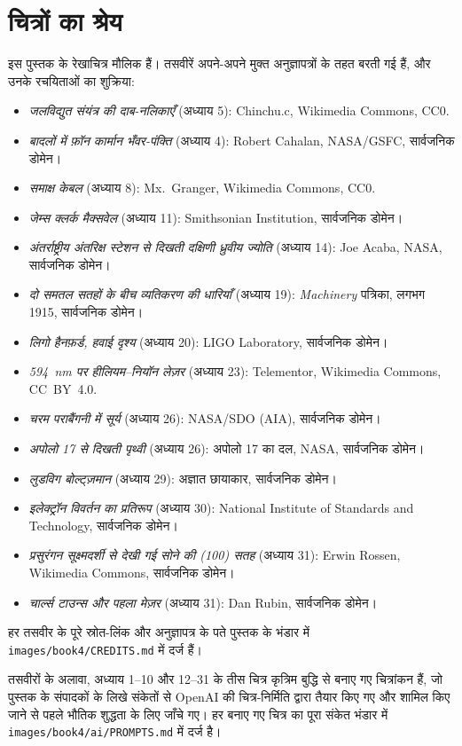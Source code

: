 \chapter*{चित्रों का श्रेय}

इस पुस्तक के रेखाचित्र मौलिक हैं। तसवीरें अपने-अपने मुक्त अनुज्ञापत्रों
के तहत बरती गई हैं, और उनके रचयिताओं का शुक्रिया:

\begin{itemize}
  \item \emph{जलविद्युत संयंत्र की दाब-नलिकाएँ} (अध्याय 5):
        Chinchu.c, Wikimedia Commons, CC0.
  \item \emph{बादलों में फ़ॉन कार्मान भँवर-पंक्ति} (अध्याय 4):
        Robert Cahalan, NASA/GSFC, सार्वजनिक डोमेन।
  \item \emph{समाक्ष केबल} (अध्याय 8): Mx.~Granger, Wikimedia
        Commons, CC0.
  \item \emph{जेम्स क्लर्क मैक्सवेल} (अध्याय 11): Smithsonian
        Institution, सार्वजनिक डोमेन।
  \item \emph{अंतर्राष्ट्रीय अंतरिक्ष स्टेशन से दिखती दक्षिणी
        ध्रुवीय ज्योति} (अध्याय 14): Joe Acaba, NASA, सार्वजनिक
        डोमेन।
  \item \emph{दो समतल सतहों के बीच व्यतिकरण की धारियाँ} (अध्याय 19):
        \emph{Machinery} पत्रिका, लगभग 1915, सार्वजनिक डोमेन।
  \item \emph{लिगो हैनफ़र्ड, हवाई दृश्य} (अध्याय 20): LIGO
        Laboratory, सार्वजनिक डोमेन।
  \item \emph{594~nm पर हीलियम--नियॉन लेज़र} (अध्याय 23):
        Telementor, Wikimedia Commons, CC~BY~4.0.
  \item \emph{चरम पराबैंगनी में सूर्य} (अध्याय 26): NASA/SDO (AIA),
        सार्वजनिक डोमेन।
  \item \emph{अपोलो 17 से दिखती पृथ्वी} (अध्याय 26): अपोलो 17 का
        दल, NASA, सार्वजनिक डोमेन।
  \item \emph{लुडविग बोल्ट्ज़मान} (अध्याय 29): अज्ञात छायाकार,
        सार्वजनिक डोमेन।
  \item \emph{इलेक्ट्रॉन विवर्तन का प्रतिरूप} (अध्याय 30): National
        Institute of Standards and Technology, सार्वजनिक डोमेन।
  \item \emph{प्रसुरंगन सूक्ष्मदर्शी से देखी गई सोने की (100) सतह}
        (अध्याय 31): Erwin Rossen, Wikimedia Commons, सार्वजनिक
        डोमेन।
  \item \emph{चार्ल्स टाउन्स और पहला मेज़र} (अध्याय 31): Dan Rubin,
        सार्वजनिक डोमेन।
\end{itemize}

हर तसवीर के पूरे स्रोत-लिंक और अनुज्ञापत्र के पते पुस्तक के भंडार में
\texttt{images/book4/CREDITS.md} में दर्ज हैं।

\bigskip
तसवीरों के अलावा, अध्याय 1--10 और 12--31 के तीस चित्र कृत्रिम बुद्धि
से बनाए गए चित्रांकन हैं, जो पुस्तक के संपादकों के लिखे संकेतों से
OpenAI की चित्र-निर्मिति द्वारा तैयार किए गए और शामिल किए जाने से पहले
भौतिक शुद्धता के लिए जाँचे गए। हर बनाए गए चित्र का पूरा संकेत भंडार में
\texttt{images/book4/ai/PROMPTS.md} में दर्ज है।
\clearpage
